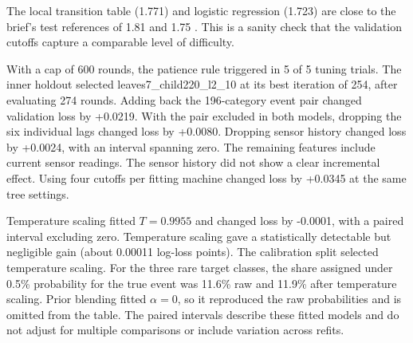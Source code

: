 The local transition table (1.771) and logistic regression (1.723) are close to the brief's test references of 1.81 and 1.75 \cite{brief}. This is a sanity check that the validation cutoffs capture a comparable level of difficulty.

With a cap of 600 rounds, the patience rule triggered in 5 of 5 tuning trials. The inner holdout selected leaves7\_child220\_l2\_10 at its best iteration of 254, after evaluating 274 rounds. Adding back the 196-category event pair changed validation loss by +0.0219. With the pair excluded in both models, dropping the six individual lags changed loss by +0.0080. Dropping sensor history changed loss by +0.0024, with an interval spanning zero. The remaining features include current sensor readings. The sensor history did not show a clear incremental effect. Using four cutoffs per fitting machine changed loss by +0.0345 at the same tree settings.

Temperature scaling fitted \(T=0.9955\) and changed loss by -0.0001, with a paired interval excluding zero. Temperature scaling gave a statistically detectable but negligible gain (about 0.00011 log-loss points). The calibration split selected temperature scaling. For the three rare target classes, the share assigned under 0.5\% probability for the true event was 11.6\% raw and 11.9\% after temperature scaling. Prior blending fitted \(\alpha=0\), so it reproduced the raw probabilities and is omitted from the table. The paired intervals describe these fitted models and do not adjust for multiple comparisons or include variation across refits.
